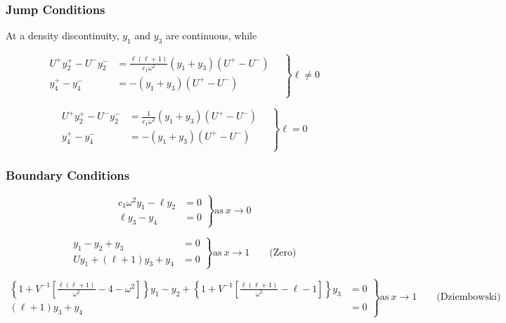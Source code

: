 \documentclass[fleqn]{article}
\begin{document}
\subsubsection*{Jump Conditions}

At a density discontinuity, $y_{1}$ and $y_{3}$ are continuous, while

\begin{equation*}
\left.
\begin{aligned}
U^{+} y_{2}^{+} - U^{-} y_{2}^{-} &= \frac{\ell(\ell+1)}{c_{1}\omega^{2}}(y_{1} + y_{3}) (U^{+} - U^{-}) \\
y_{4}^{+} - y_{4}^{-} &= -(y_{1}+y_{3}) (U^{+} - U^{-}) \\
\end{aligned}
\quad \right\} \ell \neq 0
\end{equation*}

\begin{equation*}
\left.
\begin{aligned}
U^{+} y_{2}^{+} - U^{-} y_{2}^{-} &= \frac{1}{c_{1}\omega^{2}}(y_{1} + y_{3}) (U^{+} - U^{-}) \\
y_{4}^{+} - y_{4}^{-} &= -(y_{1}+y_{3}) (U^{+} - U^{-}) \\
\end{aligned}
\quad \right\} \ell = 0
\end{equation*}

\subsubsection*{Boundary Conditions}

\begin{equation*}
\left.
\begin{aligned}
c_{1} \omega^{2} y_{1} - \ell y_{2} &= 0 \\
\ell y_{3} - y_{4} &= 0
\end{aligned}
\right\}
\text{as}\ x \rightarrow 0
\end{equation*}

\begin{equation*}
\left.
\begin{aligned}
y_{1} - y_{2} + y_{3} &= 0 \\
U y_{1} + (\ell + 1) y_{3} + y_{4} &= 0
\end{aligned}
\right\}
\text{as}\ x \rightarrow 1 \qquad \text{(Zero)}
\end{equation*}

\begin{equation*}
\left.
\begin{aligned}
\left\{ 1 + V^{-1} \left[ \frac{\ell(\ell+1)}{\omega^{2}} - 4 - \omega^{2} \right] \right\} y_{1} -
y_{2} +
\left\{ 1 + V^{-1} \left[ \frac{\ell(\ell+1)}{\omega^{2}} - \ell - 1 \right] \right\} y_{3} &= 0 \\
(\ell + 1) y_{3} + y_{4} &= 0
\end{aligned}
\right\} 
\text{as}\ x \rightarrow 1 \qquad \text{(Dziembowski)}
\end{equation*}
\end{document}
